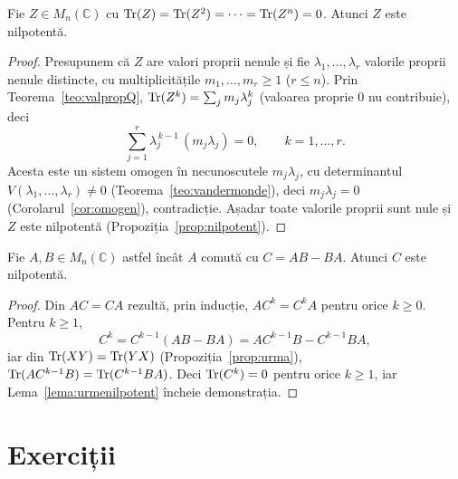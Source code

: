 \begin{lema}\label{lema:urmenilpotent}
Fie $Z\in M_n(\mathbb{C})$ cu $\operatorname{Tr}(Z)=\operatorname{Tr}(Z^2)=\cdots=\operatorname{Tr}(Z^n)=0$. Atunci $Z$ este nilpotentă.
\end{lema}

\begin{proof}
Presupunem că $Z$ are valori proprii nenule și fie $\lambda_1,\dots,\lambda_r$ valorile proprii nenule distincte, cu multiplicitățile $m_1,\dots,m_r\ge1$ ($r\le n$). Prin Teorema~\ref{teo:valpropQ}, $\operatorname{Tr}(Z^k)=\sum_jm_j\lambda_j^k$ (valoarea proprie $0$ nu contribuie), deci
\[
\sum_{j=1}^r\lambda_j^{\,k-1}\,(m_j\lambda_j)=0,\qquad k=1,\dots,r .
\]
Acesta este un sistem omogen în necunoscutele $m_j\lambda_j$, cu determinantul $V(\lambda_1,\dots,\lambda_r)\neq0$ (Teorema~\ref{teo:vandermonde}), deci $m_j\lambda_j=0$ (Corolarul~\ref{cor:omogen}), contradicție. Așadar toate valorile proprii sunt nule și $Z$ este nilpotentă (Propoziția~\ref{prop:nilpotent}).
\end{proof}

\begin{lema}[Jacobson]\label{lema:jacobson}
Fie $A,B\in M_n(\mathbb{C})$ astfel încât $A$ comută cu $C=AB-BA$. Atunci $C$ este nilpotentă.
\end{lema}

\begin{proof}
Din $AC=CA$ rezultă, prin inducție, $AC^k=C^kA$ pentru orice $k\ge0$. Pentru $k\ge1$,
\[
C^k=C^{k-1}(AB-BA)=AC^{k-1}B-C^{k-1}BA,
\]
iar din $\operatorname{Tr}(XY)=\operatorname{Tr}(YX)$ (Propoziția~\ref{prop:urma}), $\operatorname{Tr}(AC^{k-1}B)=\operatorname{Tr}(C^{k-1}BA)$. Deci $\operatorname{Tr}(C^k)=0$ pentru orice $k\ge1$, iar Lema~\ref{lema:urmenilpotent} încheie demonstrația.
\end{proof}

\section{Exerciții}


